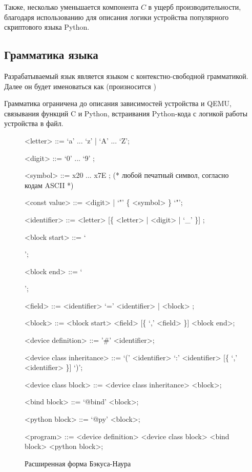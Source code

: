 Также, несколько уменьшается компонента $C$ в ущерб производительности,
благодаря использованию для описания логики устройства
популярного скриптового языка Python.

\subsection{Грамматика языка}\label{sec:ch2/sec2/sub2}
Разрабатываемый язык является языком с контекстно-свободной грамматикой.
Далее он будет именоваться как {\mylanguage} (произносится \mylanguageprononciation)

Грамматика {\mylanguage} ограничена до описания зависимостей устройства и QEMU,
связывания функций C и Python, встраивания Python-кода с логикой работы устройства
в файл.


\setlength{\grammarparsep}{0.1cm}
\setlength{\grammarindent}{13em}
\begin{figure}[!htbp]
    \begin{grammar}
        <letter> ::= `a' ... `z' | `A' ... `Z';

        <digit> ::= `0' ... `9' ;

        <symbol> ::= x20 ... x7E ; (* любой печатный символ, согласно кодам ASCII *)

        <const value> ::= <digit> | `"' \{ <symbol> \} `"';

        <identifier> ::= <letter> [\{ <letter> | <digit> | `\_' \}] ;

        <block start> ::= `{';

        <block end> ::= `}';

        <field> ::= <identifier> `=' <identifier> | <block> ;

        <block> ::= <block start> <field> [\{ `,' <field> \}] <block end>;

        <device definition> ::= '\#' <identifier>;

        <device class inheritance> ::= `(' <identifier> `:' <identifier> [\{ `,' <identifier> \}] `)';

        <device class block> ::= <device class inheritance> <block>;

        <bind block> ::= `@bind' <block>;

        <python block> ::= `@py' <block>;

        <program> ::= <device definition> <device class block> <bind block> <python block>;
    \end{grammar}
    \caption{Расширенная форма Бэкуса-Наура \mylanguage}\label{fig:qpydev-grammar}
\end{figure}


